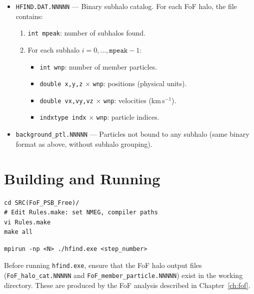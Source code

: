 \documentclass[11pt,fleqn]{book}
\newcommand{\code}[1]{\texttt{#1}}
\newcommand{\file}[1]{\texttt{#1}}
\begin{document}
\begin{itemize}[leftmargin=2em]
  \item \file{HFIND.DAT.NNNNN} --- Binary subhalo catalog.  For each FoF halo, the file contains:
    \begin{enumerate}[leftmargin=2em]
      \item \code{int mpeak}: number of subhalos found.
      \item For each subhalo $i = 0, \ldots, \code{mpeak}-1$:
        \begin{itemize}[leftmargin=2em]
          \item \code{int wnp}: number of member particles.
          \item \code{double x,y,z} $\times$ \code{wnp}: positions (physical units).
          \item \code{double vx,vy,vz} $\times$ \code{wnp}: velocities (km\,s$^{-1}$).
          \item \code{indxtype indx} $\times$ \code{wnp}: particle indices.
        \end{itemize}
    \end{enumerate}
  \item \file{background\_ptl.NNNNN} --- Particles not bound to any subhalo (same binary format as above, without subhalo grouping).
\end{itemize}

\section{Building and Running}

\begin{codebox}[Compilation]
\begin{lstlisting}[style=bash,numbers=none]
cd SRC(FoF_PSB_Free)/
# Edit Rules.make: set NMEG, compiler paths
vi Rules.make
make all
\end{lstlisting}
\end{codebox}

\begin{codebox}[Execution]
\begin{lstlisting}[style=bash,numbers=none]
mpirun -np <N> ./hfind.exe <step_number>
\end{lstlisting}
\end{codebox}

\begin{infobox}[Prerequisites]
Before running \code{hfind.exe}, ensure that the FoF halo output files (\file{FoF\_halo\_cat.NNNNN} and \file{FoF\_member\_particle.NNNNN}) exist in the working directory.  These are produced by the FoF analysis described in Chapter~\ref{ch:fof}.
\end{infobox}
\end{document}
